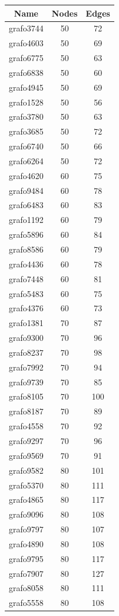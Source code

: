 \documentclass[bachelor, english]{algothesis}
\begin{document}
\hfill 
\begin{minipage}{.32\textwidth} %
\hspace*{-0.5cm} 
\begin{tabular}{|c|c|c|}
\hline
Name & Nodes & Edges \\
\hline
grafo3744 & 50 & 72 \\
grafo4603 & 50 & 69 \\
grafo6775 & 50 & 63 \\
grafo6838 & 50 & 60 \\
grafo4945 & 50 & 69 \\
grafo1528 & 50 & 56 \\
grafo3780 & 50 & 63 \\
grafo3685 & 50 & 72 \\
grafo6740 & 50 & 66 \\
grafo6264 & 50 & 72 \\
\hline
grafo4620 & 60 & 75 \\
grafo9484 & 60 & 78 \\
grafo6483 & 60 & 83 \\
grafo1192 & 60 & 79 \\
grafo5896 & 60 & 84 \\
grafo8586 & 60 & 79 \\
grafo4436 & 60 & 78 \\
grafo7448 & 60 & 81 \\
grafo5483 & 60 & 75 \\
grafo4376 & 60 & 73 \\
\hline
grafo1381 & 70 & 87 \\
grafo9300 & 70 & 96 \\
grafo8237 & 70 & 98 \\
grafo7992 & 70 & 94 \\
grafo9739 & 70 & 85 \\
grafo8105 & 70 & 100 \\
grafo8187 & 70 & 89 \\
grafo4558 & 70 & 92 \\
grafo9297 & 70 & 96 \\
grafo9569 & 70 & 91 \\
\hline
grafo9582 & 80 & 101 \\
grafo5370 & 80 & 111 \\
grafo4865 & 80 & 117 \\
grafo9096 & 80 & 108 \\
grafo9797 & 80 & 107 \\
grafo4890 & 80 & 108 \\
grafo9795 & 80 & 117 \\
grafo7907 & 80 & 127 \\
grafo8058 & 80 & 111 \\
grafo5558 & 80 & 108 \\
\hline
\end{tabular}
\label{tab:Test_Data}
\end{minipage}%
\end{document}

